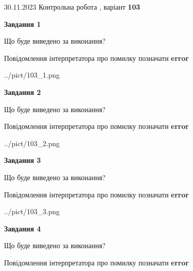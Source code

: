 \documentclass[12pt, ukrainian]{article}
\begin{document}
{{30.11.2023 Контрольна робота , варіант  \No \textbf { 103 }\par}}
{




{\begin {center}\textbf{Завдання 1}\end {center}}\par
Що буде виведено за виконання? \par
Повідомлення інтерпретатора про помилку позначати \textbf{error}

\begin{center}
	{../pict/103_1.png}
\end{center}
\newpage

{\begin {center}\textbf{Завдання 2}\end {center}}\par
Що буде виведено за виконання? \par
Повідомлення інтерпретатора про помилку позначати \textbf{error}

\begin{center}
	{../pict/103_2.png}
\end{center}
\newpage

{\begin {center}\textbf{Завдання 3}\end {center}}\par
Що буде виведено за виконання? \par
Повідомлення інтерпретатора про помилку позначати \textbf{error}

\begin{center}
	{../pict/103_3.png}
\end{center}
\newpage

{\begin {center}\textbf{Завдання 4}\end {center}}\par
Що буде виведено за виконання? \par
Повідомлення інтерпретатора про помилку позначати \textbf{error}

}
\end{document}
